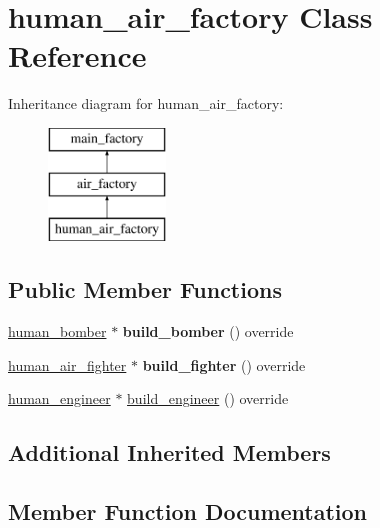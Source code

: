 \hypertarget{classhuman__air__factory}{}\section{human\+\_\+air\+\_\+factory Class Reference}
\label{classhuman__air__factory}
Inheritance diagram for human\+\_\+air\+\_\+factory\+:\begin{figure}[H]
\begin{center}
\leavevmode
\includegraphics[height=3.000000cm]{classhuman__air__factory}
\end{center}
\end{figure}
\subsection*{Public Member Functions}
\begin{DoxyCompactItemize}
\item 
\mbox{\label{classhuman__air__factory_a3d60a824005f82e14becc37a4c62873f}} 
\mbox{\hyperlink{classhuman__bomber}{human\+\_\+bomber}} $\ast$ {\bfseries build\+\_\+bomber} () override
\item 
\mbox{\label{classhuman__air__factory_ab773ad15d45d82eefcae174205382ef6}} 
\mbox{\hyperlink{classhuman__air__fighter}{human\+\_\+air\+\_\+fighter}} $\ast$ {\bfseries build\+\_\+fighter} () override
\item 
\mbox{\hyperlink{classhuman__engineer}{human\+\_\+engineer}} $\ast$ \mbox{\hyperlink{classhuman__air__factory_a34707f920a66afe9af4d5b0ecef8b2a7}{build\+\_\+engineer}} () override
\end{DoxyCompactItemize}
\subsection*{Additional Inherited Members}


\subsection{Member Function Documentation}
\mbox{\label{classhuman__air__factory_a34707f920a66afe9af4d5b0ecef8b2a7}} 
